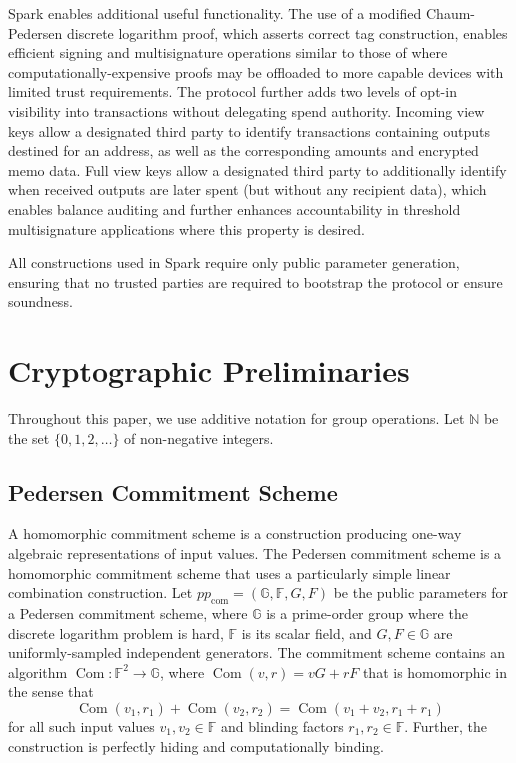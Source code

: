 \documentclass{llncs}
\newcommand{\G}{\mathbb{G}}
\newcommand{\F}{\mathbb{F}}
\newcommand{\com}{\operatorname{Com}}
\begin{document}
Spark enables additional useful functionality.
The use of a modified Chaum-Pedersen discrete logarithm proof, which asserts correct tag construction, enables efficient signing and multisignature operations similar to those of \cite{musig} where computationally-expensive proofs may be offloaded to more capable devices with limited trust requirements.
The protocol further adds two levels of opt-in visibility into transactions without delegating spend authority.
Incoming view keys allow a designated third party to identify transactions containing outputs destined for an address, as well as the corresponding amounts and encrypted memo data.
Full view keys allow a designated third party to additionally identify when received outputs are later spent (but without any recipient data), which enables balance auditing and further enhances accountability in threshold multisignature applications where this property is desired.

All constructions used in Spark require only public parameter generation, ensuring that no trusted parties are required to bootstrap the protocol or ensure soundness.


\section {Cryptographic Preliminaries}

Throughout this paper, we use additive notation for group operations.
Let $\mathbb{N}$ be the set $\{0,1,2,\ldots\}$ of non-negative integers.


\subsection{Pedersen Commitment Scheme}

A homomorphic commitment scheme is a construction producing one-way algebraic representations of input values.
The Pedersen commitment scheme is a homomorphic commitment scheme that uses a particularly simple linear combination construction.
Let $pp_{\text{com}} = (\G, \F, G, F)$ be the public parameters for a Pedersen commitment scheme, where $\G$ is a prime-order group where the discrete logarithm problem is hard, $\F$ is its scalar field, and $G,F \in \G$ are uniformly-sampled independent generators.
The commitment scheme contains an algorithm $\com: \F^2 \to \G$, where $\com(v,r) = vG + rF$ that is homomorphic in the sense that $$\com(v_1,r_1) + \com(v_2,r_2) = \com(v_1 + v_2,r_1 + r_1)$$ for all such input values $v_1,v_2 \in \F$ and blinding factors $r_1,r_2 \in \F$.
Further, the construction is perfectly hiding and computationally binding.
\end{document}
